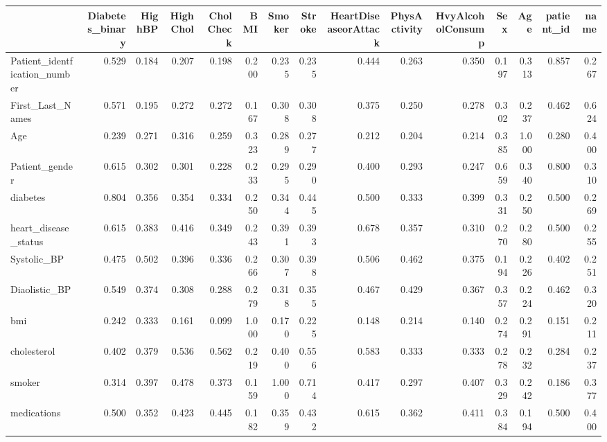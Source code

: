 \begin{tabular}{lrrrrrrrrrrrrrr}
\toprule
 & Diabetes_binary & HighBP & HighChol & CholCheck & BMI & Smoker & Stroke & HeartDiseaseorAttack & PhysActivity & HvyAlcoholConsump & Sex & Age & patient_id & name \\
\midrule
Patient_identfication_number & 0.529 & 0.184 & 0.207 & 0.198 & 0.200 & 0.235 & 0.235 & 0.444 & 0.263 & 0.350 & 0.197 & 0.313 & 0.857 & 0.267 \\
First_Last_Names & 0.571 & 0.195 & 0.272 & 0.272 & 0.167 & 0.308 & 0.308 & 0.375 & 0.250 & 0.278 & 0.302 & 0.237 & 0.462 & 0.624 \\
Age & 0.239 & 0.271 & 0.316 & 0.259 & 0.323 & 0.289 & 0.277 & 0.212 & 0.204 & 0.214 & 0.385 & 1.000 & 0.280 & 0.400 \\
Patient_gender & 0.615 & 0.302 & 0.301 & 0.228 & 0.233 & 0.295 & 0.290 & 0.400 & 0.293 & 0.247 & 0.659 & 0.340 & 0.800 & 0.310 \\
diabetes & 0.804 & 0.356 & 0.354 & 0.334 & 0.250 & 0.344 & 0.445 & 0.500 & 0.333 & 0.399 & 0.331 & 0.250 & 0.500 & 0.269 \\
heart_disease_status & 0.615 & 0.383 & 0.416 & 0.349 & 0.243 & 0.391 & 0.393 & 0.678 & 0.357 & 0.310 & 0.270 & 0.280 & 0.500 & 0.255 \\
Systolic_BP & 0.475 & 0.502 & 0.396 & 0.336 & 0.266 & 0.307 & 0.398 & 0.506 & 0.462 & 0.375 & 0.194 & 0.226 & 0.402 & 0.251 \\
Diaolistic_BP & 0.549 & 0.374 & 0.308 & 0.288 & 0.279 & 0.318 & 0.355 & 0.467 & 0.429 & 0.367 & 0.357 & 0.224 & 0.462 & 0.320 \\
bmi & 0.242 & 0.333 & 0.161 & 0.099 & 1.000 & 0.170 & 0.225 & 0.148 & 0.214 & 0.140 & 0.274 & 0.291 & 0.151 & 0.211 \\
cholesterol & 0.402 & 0.379 & 0.536 & 0.562 & 0.219 & 0.400 & 0.556 & 0.583 & 0.333 & 0.333 & 0.278 & 0.232 & 0.284 & 0.237 \\
smoker & 0.314 & 0.397 & 0.478 & 0.373 & 0.159 & 1.000 & 0.714 & 0.417 & 0.297 & 0.407 & 0.329 & 0.242 & 0.186 & 0.377 \\
medications & 0.500 & 0.352 & 0.423 & 0.445 & 0.182 & 0.359 & 0.432 & 0.615 & 0.362 & 0.411 & 0.384 & 0.194 & 0.500 & 0.400 \\
\bottomrule
\end{tabular}
